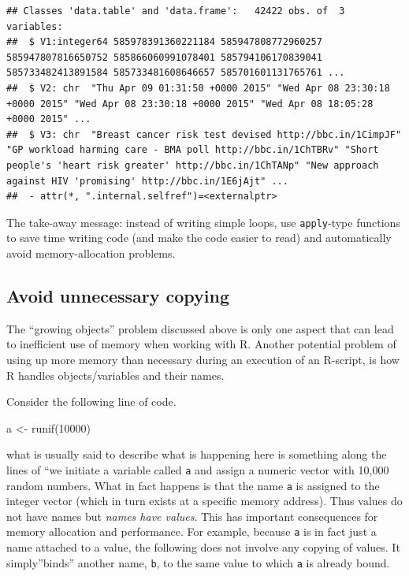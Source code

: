 \documentclass[
  12pt,
]{style/krantz}
\newenvironment{Shaded}{\begin{snugshade}}{\end{snugshade}}
\newcommand{\DecValTok}[1]{\textcolor[rgb]{0.00,0.00,0.81}{#1}}
\newcommand{\FunctionTok}[1]{\textcolor[rgb]{0.00,0.00,0.00}{#1}}
\newcommand{\NormalTok}[1]{#1}
\newcommand{\OtherTok}[1]{\textcolor[rgb]{0.56,0.35,0.01}{#1}}
\begin{document}
\begin{verbatim}
## Classes 'data.table' and 'data.frame':   42422 obs. of  3 variables:
##  $ V1:integer64 585978391360221184 585947808772960257 585947807816650752 585866060991078401 585794106170839041 585733482413891584 585733481608646657 585701601131765761 ... 
##  $ V2: chr  "Thu Apr 09 01:31:50 +0000 2015" "Wed Apr 08 23:30:18 +0000 2015" "Wed Apr 08 23:30:18 +0000 2015" "Wed Apr 08 18:05:28 +0000 2015" ...
##  $ V3: chr  "Breast cancer risk test devised http://bbc.in/1CimpJF" "GP workload harming care - BMA poll http://bbc.in/1ChTBRv" "Short people's 'heart risk greater' http://bbc.in/1ChTANp" "New approach against HIV 'promising' http://bbc.in/1E6jAjt" ...
##  - attr(*, ".internal.selfref")=<externalptr>
\end{verbatim}

The take-away message: instead of writing simple loops, use \texttt{apply}-type functions to save time writing code (and make the code easier to read) and automatically avoid memory-allocation problems.

\hypertarget{avoid-unnecessary-copying}{%
\subsection{Avoid unnecessary copying}\label{avoid-unnecessary-copying}}

The ``growing objects'' problem discussed above is only one aspect that can lead to inefficient use of memory when working with R. Another potential problem of using up more memory than necessary during an execution of an R-script, is how R handles objects/variables and their names.

Consider the following line of code.

\begin{Shaded}
\begin{Highlighting}[]
\NormalTok{a }\OtherTok{\textless{}{-}} \FunctionTok{runif}\NormalTok{(}\DecValTok{10000}\NormalTok{)}
\end{Highlighting}
\end{Shaded}

what is usually said to describe what is happening here is something along the lines of ``we initiate a variable called \texttt{a} and assign a numeric vector with 10,000 random numbers. What in fact happens is that the name \texttt{a} is assigned to the integer vector (which in turn exists at a specific memory address). Thus values do not have names but \emph{names have values}. This has important consequences for memory allocation and performance. For example, because \texttt{a} is in fact just a name attached to a value, the following does not involve any copying of values. It simply''binds'' another name, \texttt{b}, to the same value to which \texttt{a} is already bound.
\end{document}
